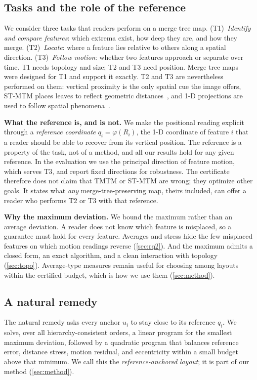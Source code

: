 \documentclass[review]{vgtc}                 %
\begin{document}
\subsection{Tasks and the role of the reference}\label{sec:tasks}
We consider three tasks that readers perform on a merge tree map. (T1)~\emph{Identify and compare features}: which extrema exist, how deep they are, and how they merge. (T2)~\emph{Locate}: where a feature lies relative to others along a spatial direction. (T3)~\emph{Follow motion}: whether two features approach or separate over time. T1 needs topology and size; T2 and T3 need position. Merge tree maps were designed for T1 and support it exactly. T2 and T3 are nevertheless performed on them: vertical proximity is the only spatial cue the image offers, ST-MTM places leaves to reflect geometric distances~\cite{STMTM:2026}, and 1-D projections are used to follow spatial phenomena~\cite{Franke:2021:1DP}.

\textbf{What the reference is, and is not.} We make the positional reading explicit through a \emph{reference coordinate} $q_i=\varphi(R_i)$, the 1-D coordinate of feature $i$ that a reader should be able to recover from its vertical position. The reference is a property of the task, not of a method, and all our results hold for any given reference. In the evaluation we use the principal direction of feature motion, which serves T3, and report fixed directions for robustness. The certificate therefore does not claim that TMTM or ST-MTM are wrong; they optimize other goals. It states what \emph{any} merge-tree-preserving map, theirs included, can offer a reader who performs T2 or T3 with that reference.

\textbf{Why the maximum deviation.} We bound the maximum rather than an average deviation. A reader does not know which feature is misplaced, so a guarantee must hold for every feature. Averages and stress hide the few misplaced features on which motion readings reverse (\cref{sec:rq2}). And the maximum admits a closed form, an exact algorithm, and a clean interaction with topology (\cref{sec:topo}). Average-type measures remain useful for choosing among layouts within the certified budget, which is how we use them (\cref{sec:method}).

\subsection{A natural remedy}
The natural remedy asks every anchor $u_i$ to stay close to its reference $q_i$. We solve, over all hierarchy-consistent orders, a linear program for the smallest maximum deviation, followed by a quadratic program that balances reference error, distance stress, motion residual, and eccentricity within a small budget above that minimum. We call this the \emph{reference-anchored layout}; it is part of our method (\cref{sec:method}).
\end{document}
